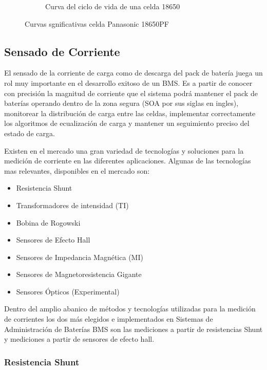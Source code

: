 \documentclass[10pt,a4paper]{article}
\begin{document}
\begin{figure}[h!]
\begin{centering}
\begin{subfigure}[t]{1\textwidth}
        	 		\caption{Curva del ciclo de vida de una celda 18650}
        	 		\label{life_cycle_18650}
        	 \end{subfigure}
         \end{centering}
        \caption{Curvas sgnificativas celda Panasonic 18650PF}
        \label{curvas_sign_18650}
	\end{figure}

    \newpage 

	\subsection{Sensado de Corriente}
	
	\noindent El sensado de la corriente de carga como de descarga del 
    pack de batería juega un rol muy importante en el desarrollo exitoso de un 
    \acrshort{BMS}. Es a partir de conocer con precisión la magnitud de corriente que el 
    sistema podrá mantener el pack de baterías operando dentro de la zona 
    segura (\acrshort{SOA} por sus siglas en ingles), monitorear la distribución de carga 
    entre las celdas, implementar correctamente los algoritmos de ecualización 
    de carga y mantener un seguimiento preciso del estado de carga.
	
	Existen en el mercado una gran variedad de tecnologías y soluciones para la medición de corriente en las diferentes aplicaciones. Algunas de las tecnologías mas relevantes, disponibles en el mercado son:
	\begin{itemize}
		\item Resistencia Shunt
		\item Transformadores de intensidad (TI)
		\item Bobina de Rogowski 
		\item Sensores de Efecto Hall
		\item Sensores de Impedancia Magnética (MI)
		\item Sensores de Magnetoresistencia Gigante 
		\item Sensores Ópticos (Experimental)
	\end{itemize}
	
	Dentro del amplio abanico de métodos y tecnologías utilizadas para la medición de corrientes los dos más elegidos e implementados en Sistemas de Administración de Baterías \acrshort{BMS} son las mediciones a partir de resistencias Shunt y mediciones a partir de sensores de efecto hall.
	
	\subsubsection{Resistencia Shunt}
\end{document}
